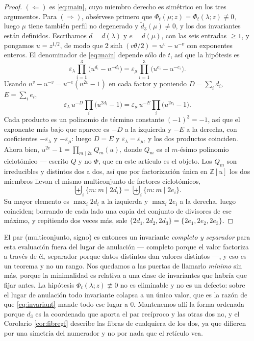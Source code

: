 \documentclass[11pt,reqno]{amsart}
\theoremstyle{plain}
\theoremstyle{definition}
\newcommand{\ZZ}{\mathbb{Z}}
\begin{document}
\begin{proof}
$(\Leftarrow)$ es \eqref{eq:main}, cuyo miembro derecho es simétrico en los tres argumentos. Para
$(\Rightarrow)$, obsérvese primero que $\Phi_t(\mu;z)=\Phi_t(\lambda;z)\not\equiv0$, luego $\mu$
tiene también perfil no degenerado y $\tilde d_3(\mu)\ne0$, y los dos invariantes están definidos.
Escribamos $d=d(\lambda)$ y $e=d(\mu)$, con las seis entradas $\ge1$, y pongamos $u=z^{1/2}$, de modo
que $2\sinh(v\theta/2)=u^{v}-u^{-v}$ con exponentes enteros. El denominador de \eqref{eq:main}
depende sólo de $t$, así que la hipótesis es
\[
\varepsilon_\lambda\prod_{i=1}^{3}\bigl(u^{d_i}-u^{-d_i}\bigr)
=\varepsilon_\mu\prod_{i=1}^{3}\bigl(u^{e_i}-u^{-e_i}\bigr).
\]
Usando $u^{v}-u^{-v}=u^{-v}(u^{2v}-1)$ en cada factor y poniendo $D=\sum_id_i$, $E=\sum_ie_i$,
\[
\varepsilon_\lambda\,u^{-D}\prod_{i}\bigl(u^{2d_i}-1\bigr)
=\varepsilon_\mu\,u^{-E}\prod_{i}\bigl(u^{2e_i}-1\bigr).
\]
Cada producto es un polinomio de término constante $(-1)^3=-1$, así que el exponente más bajo que
aparece es $-D$ a la izquierda y $-E$ a la derecha, con coeficientes $-\varepsilon_\lambda$ y
$-\varepsilon_\mu$: luego $D=E$ y $\varepsilon_\lambda=\varepsilon_\mu$, y los dos productos
coinciden. Ahora bien, $u^{2v}-1=\prod_{m\mid2v}Q_m(u)$, donde $Q_m$ es el $m$-ésimo polinomio
ciclotómico --- escrito $Q$ y no $\Phi$, que en este artículo es el objeto. Los $Q_m$ son
irreducibles y distintos dos a dos, así que por factorización única en $\ZZ[u]$ los dos miembros
llevan el mismo multiconjunto de factores ciclotómicos,
\[
\biguplus_i\{m:m\mid 2d_i\}=\biguplus_i\{m:m\mid 2e_i\} .
\]
Su mayor elemento es $\max_i2d_i$ a la izquierda y $\max_i2e_i$ a la derecha, luego coinciden;
borrando de cada lado una copia del conjunto de divisores de ese máximo, y repitiendo dos veces más,
sale $\{2d_1,2d_2,2d_3\}=\{2e_1,2e_2,2e_3\}$.
\end{proof}

\noindent El par (multiconjunto, signo) es entonces un invariante \emph{completo y separador} para
esta evaluación fuera del lugar de anulación --- completo porque el valor factoriza a través de él,
separador porque datos distintos dan valores distintos ---, y eso es un teorema y no un rango. Nos
quedamos a las puertas de llamarlo \emph{mínimo} sin más, porque la minimalidad es relativa a una
clase de invariantes que habría que fijar antes. La hipótesis $\Phi_t(\lambda;z)\not\equiv0$ no es
eliminable y no es un defecto: sobre el lugar de anulación todo invariante colapsa a un único valor,
que es la razón de que \eqref{eq:invariant} mande todo ese lugar a $0$. Mantenemos allí la forma
ordenada porque $d_3$ es la coordenada que aporta el par recíproco y las otras dos no, y el Corolario
\ref{cor:fibregf} describe las fibras de cualquiera de los dos, ya que difieren por una simetría del
numerador y no por nada que el retículo vea.
\end{document}
